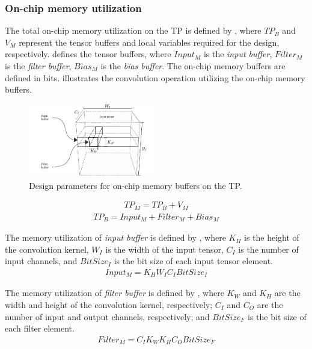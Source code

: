 \subsubsection{\textbf{On-chip memory utilization}}
\label{sec:memory_utilization}
The total on-chip memory utilization on the TP is defined by , where $TP_B$ and $V_{M}$ represent the tensor buffers and local variables required for the design, respectively.  defines the tensor buffers, where $Input_{M}$ is the \emph{input buffer}, $Filter_{M}$ is the \emph{filter buffer}, $Bias_{M}$ is the \emph{bias buffer}. The on-chip memory buffers are defined in bits.  illustrates the convolution operation utilizing the on-chip memory buffers.
\begin{figure}[t!]
	\centering
	\includegraphics[width=0.5\textwidth]{../figures/accelerator_buffers.pdf}
	\caption{Design parameters for on-chip memory buffers on the TP.}
	\label{fig:accelerator_buffers}
\end{figure}
\begin{eqnarray} \label{eq:tp_memory}
TP_{M}=TP_B+V_{M}
\end{eqnarray}
\begin{eqnarray} \label{eq:tp_memory_buffer}
TP_{B}=Input_{M}+Filter_{M}+Bias_{M}
\end{eqnarray}

The memory utilization of \emph{input buffer} is defined by , where $K_{H}$ is the height of the convolution kernel, $W_{I}$ is the width of the input tensor, $C_{I}$ is the number of input channels, and $BitSize_{I}$ is the bit size of each input tensor element.
\begin{eqnarray} \label{eq:input_memory}
Input_{M}=K_{H}W_{I}C_{I}BitSize_{I}
\end{eqnarray}

The memory utilization of \emph{filter buffer} is defined by , where $K_{W}$ and $K_{H}$ are the width and height of the convolution kernel, respectively; $C_{I}$ and $C_{O}$ are the number of input and output channels, respectively; and $BitSize_{F}$ is the bit size of each filter element.
\begin{eqnarray} \label{eq:filter_memory}
Filter_{M}=C_{I}K_{W}K_{H}C_{O}BitSize_{F}
\end{eqnarray}

